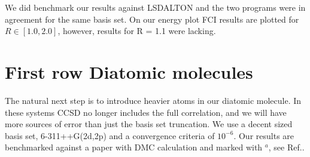 We did benchmark our results against LSDALTON and the two programs
were in agreement for the same basis set. On our energy plot FCI
results are plotted for $R \in [1.0, 2.0]$, however, results for R =
1.1 were lacking.

\section{First row Diatomic molecules}
The natural next step is to introduce heavier atoms in our diatomic
molecule. In these systems CCSD no longer includes the full
correlation, and we will have more sources of error than just the
basis set truncation. We use a decent sized basis set, 6-311++G(2d,2p)
and a convergence criteria of $10^{-6}$. Our results are benchmarked
against a paper with DMC calculation and marked with $^a$, see
Ref.\cite{first_row_diatomic_referance_stuff}. \\

